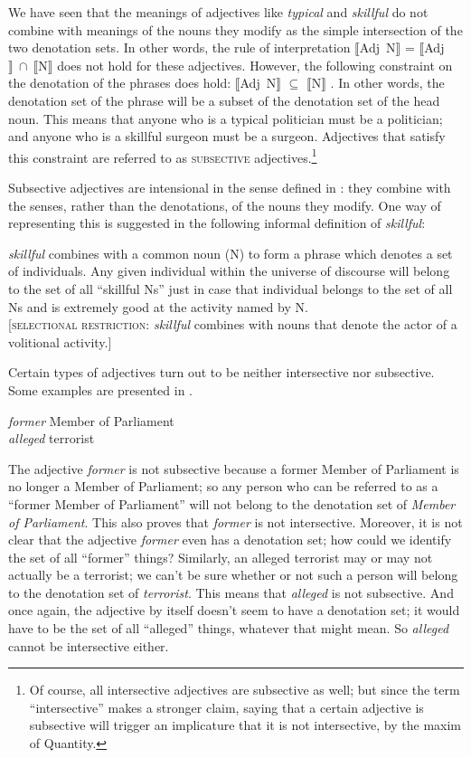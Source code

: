 We have seen that the meanings of adjectives like \textit{typical} and \textit{skillful} do not combine with meanings of the nouns they modify as the simple intersection of the two denotation sets. In other words, the rule of interpretation $\llbracket$Adj~N$\rrbracket$  = $\llbracket$Adj$\rrbracket~{\cap}~\llbracket$N$\rrbracket$  does not hold for these adjectives. However, the following constraint on the denotation of the phrases does hold: $\llbracket$Adj~N$\rrbracket$  ${\subseteq}$ $\llbracket$N$\rrbracket$ . In other words, the denotation set of the phrase will be a subset of the denotation set of the head noun. This means that anyone who is a typical politician must be a politician; and anyone who is a skillful surgeon must be a surgeon. Adjectives that satisfy this constraint are referred to as \textsc{subsective} adjectives.\footnote{Of course, all intersective adjectives are subsective as well; but since the term “intersective” makes a stronger claim, saying that a certain adjective is subsective will trigger an implicature that it is not intersective, by the maxim of Quantity.}



Subsective adjectives are intensional in the sense defined in : they combine with the senses, rather than the denotations, of the nouns they modify. One way of representing this is suggested in the following informal definition of \textit{skillful}:


\ea \label{ex:15.9}
\textit{skillful} combines with a common noun (N) to form a phrase which denotes a set of individuals. Any given individual within the universe of discourse will belong to the set of all “skillful Ns” just in case that individual belongs to the set of all Ns and is extremely good at the activity named by N.\\
{}[\textsc{selectional restriction}: \textit{skillful} combines with nouns that denote the actor of a volitional activity.]
\z


Certain types of adjectives turn out to be neither intersective nor subsective. Some examples are presented in .


\ea \label{ex:15.10}
\ea  \textit{former} Member of Parliament\\
\ex \textit{alleged} terrorist
\z \z


The adjective \textit{former} is not subsective because a former Member of Parliament is no longer a Member of Parliament; so any person who can be referred to as a “former Member of Parliament” will not belong to the denotation set of \textit{Member of Parliament}. This also proves that \textit{former} is not intersective. Moreover, it is not clear that the adjective \textit{former} even has a denotation set; how could we identify the set of all “former” things? Similarly, an alleged terrorist may or may not actually be a terrorist; we can’t be sure whether or not such a person will belong to the denotation set of \textit{terrorist}. This means that \textit{alleged} is not subsective. And once again, the adjective by itself doesn’t seem to have a denotation set; it would have to be the set of all “alleged” things, whatever that might mean. So \textit{alleged} cannot be intersective either.



